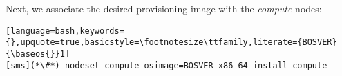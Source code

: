 Next, we associate the desired provisioning image with the {\em compute} nodes:

\begin{lstlisting}[language=bash,keywords={},upquote=true,basicstyle=\footnotesize\ttfamily,literate={BOSVER}{\baseos{}}1]
[sms](*\#*) nodeset compute osimage=BOSVER-x86_64-install-compute
\end{lstlisting}
